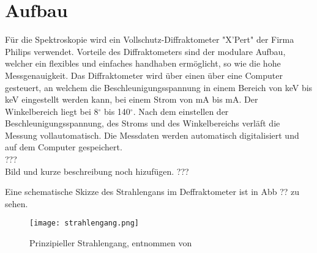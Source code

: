 \section{Aufbau}
F\"ur die Spektroskopie wird ein Vollschutz-Diffraktometer "X'Pert" der Firma Philips verwendet.
Vorteile des Diffraktometers sind der modulare Aufbau, welcher ein flexibles und einfaches handhaben erm\"oglicht, so wie die hohe Messgenauigkeit.
Das Diffraktometer wird \"uber einen \"uber eine Computer gesteuert, an welchem die Beschleunigungsspannung in einem Bereich von \unit[15]{keV} bis \unit[50]{keV} eingestellt werden kann, bei einem Strom von \unit[5]{mA} bis \unit[36]{mA}.
Der Winkelbereich liegt bei 8$^\circ$ bis 140$^\circ$.
Nach dem einstellen der Beschleunigungsspannung, des Stroms und des Winkelbereichs verl\"aft die Messung vollautomatisch.
Die Messdaten werden automatisch digitalisiert und auf dem Computer gespeichert.
\\
??? \\
Bild und kurze beschreibung noch hizuf\"ugen.  \linebreak
??? \linebreak

Eine schematische Skizze des Strahlengans im Deffraktometer ist in Abb ?? zu sehen.

\begin{figure}[ht]
	\centering
  \texttt{[image: strahlengang.png]}
	\caption{Prinzipieller Strahlengang, entnommen von \cite{anleitung}}
	\label{fig:strahlengang}
\end{figure}
